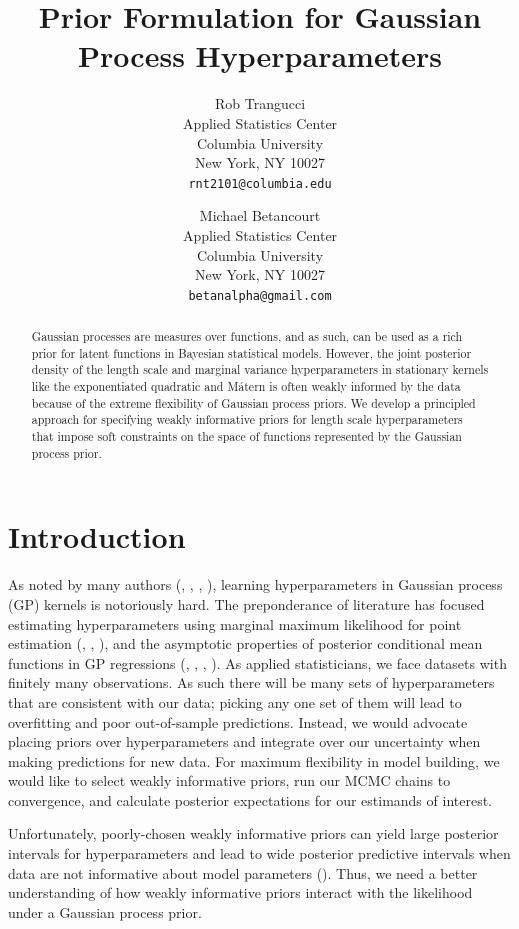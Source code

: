 \documentclass{article}
\title{Prior Formulation for Gaussian Process Hyperparameters}
\author{
  Rob Trangucci \\
  Applied Statistics Center\\
  Columbia University\\
  New York, NY 10027 \\
  \texttt{rnt2101@columbia.edu} \\
  \and
  Michael Betancourt \\
  Applied Statistics Center \\
  Columbia University \\
  New York, NY 10027 \\
  \texttt{betanalpha@gmail.com} \\
}
\begin{document}

\maketitle

\begin{abstract}
  Gaussian processes are measures over functions, and as such, can be used as a
  rich prior for latent functions in Bayesian statistical models. However, the
  joint posterior density of the length scale and marginal variance
  hyperparameters in stationary kernels like the exponentiated quadratic and
	M\'{a}tern is often weakly informed by the data because of the extreme
  flexibility of Gaussian process priors. We develop a principled approach for
  specifying weakly informative priors for length scale hyperparameters that impose
  soft constraints on the space of functions represented by the Gaussian
  process prior.
\end{abstract}


\section{Introduction}

As noted by many authors (\citet{flaxman2015fast},
\citet{stein2012interpolation}, \citet{rasmussen2005gaussian},
\citet{fuglstad2015interpretable}), learning hyperparameters in Gaussian
process (GP) kernels is notoriously hard. The preponderance of literature has
focused estimating hyperparameters using marginal maximum likelihood for point
estimation (\citet{stein2012interpolation}, \citet{rasmussen2005gaussian}, \citet{warnes1987problems}), and
the asymptotic properties of posterior conditional mean functions in GP
regressions (\citet{seeger2008information}, \citet{stein2012interpolation},
\citet{rasmussen2005gaussian}, \citet{williams2000upper}). As applied
statisticians, we face datasets with finitely many observations. As such there
will be many sets of hyperparameters that are consistent with our data; picking
any one set of them will lead to overfitting and poor out-of-sample
predictions. Instead, we would advocate placing priors over hyperparameters and
integrate over our uncertainty when making predictions for new data. For
maximum flexibility in model building, we would like to select weakly
informative priors, run our MCMC chains to convergence, and calculate posterior
expectations for our estimands of interest. 

Unfortunately, poorly-chosen weakly informative priors
can yield large posterior intervals for hyperparameters and lead to wide
posterior predictive intervals when data are not informative about model
parameters (\citet{fuglstad2015interpretable}). Thus, we need a better
understanding of how weakly informative priors interact with the likelihood
under a Gaussian process prior.
\end{document}
